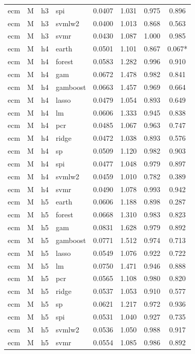 \begin{ThreePartTable}
\begin{longtable}[t]{llclcccc}
ecm & M & h3 & spi & 0.0407 & 1.031 & 0.975 & 0.896\\
ecm & M & h3 & svmlw2 & 0.0400 & 1.013 & 0.868 & 0.563\\
ecm & M & h3 & svmr & 0.0430 & 1.087 & 1.000 & 0.985\\
\addlinespace
ecm & M & h4 & earth & 0.0501 & 1.101 & 0.867 & 0.067*\\
ecm & M & h4 & forest & 0.0583 & 1.282 & 0.996 & 0.910\\
ecm & M & h4 & gam & 0.0672 & 1.478 & 0.982 & 0.841\\
ecm & M & h4 & gamboost & 0.0663 & 1.457 & 0.969 & 0.664\\
ecm & M & h4 & lasso & 0.0479 & 1.054 & 0.893 & 0.649\\
ecm & M & h4 & lm & 0.0606 & 1.333 & 0.945 & 0.838\\
ecm & M & h4 & pcr & 0.0485 & 1.067 & 0.963 & 0.747\\
ecm & M & h4 & ridge & 0.0472 & 1.038 & 0.893 & 0.576\\
ecm & M & h4 & sp & 0.0509 & 1.120 & 0.982 & 0.903\\
ecm & M & h4 & spi & 0.0477 & 1.048 & 0.979 & 0.897\\
ecm & M & h4 & svmlw2 & 0.0459 & 1.010 & 0.782 & 0.389\\
ecm & M & h4 & svmr & 0.0490 & 1.078 & 0.993 & 0.942\\
\addlinespace
ecm & M & h5 & earth & 0.0606 & 1.188 & 0.898 & 0.287\\
ecm & M & h5 & forest & 0.0668 & 1.310 & 0.983 & 0.823\\
ecm & M & h5 & gam & 0.0831 & 1.628 & 0.979 & 0.892\\
ecm & M & h5 & gamboost & 0.0771 & 1.512 & 0.974 & 0.713\\
ecm & M & h5 & lasso & 0.0549 & 1.076 & 0.922 & 0.722\\
ecm & M & h5 & lm & 0.0750 & 1.471 & 0.946 & 0.888\\
ecm & M & h5 & pcr & 0.0565 & 1.108 & 0.980 & 0.820\\
ecm & M & h5 & ridge & 0.0537 & 1.053 & 0.910 & 0.577\\
ecm & M & h5 & sp & 0.0621 & 1.217 & 0.972 & 0.936\\
ecm & M & h5 & spi & 0.0531 & 1.040 & 0.927 & 0.735\\
ecm & M & h5 & svmlw2 & 0.0536 & 1.050 & 0.988 & 0.917\\
ecm & M & h5 & svmr & 0.0554 & 1.085 & 0.986 & 0.892\\

\end{longtable}
\end{ThreePartTable}
